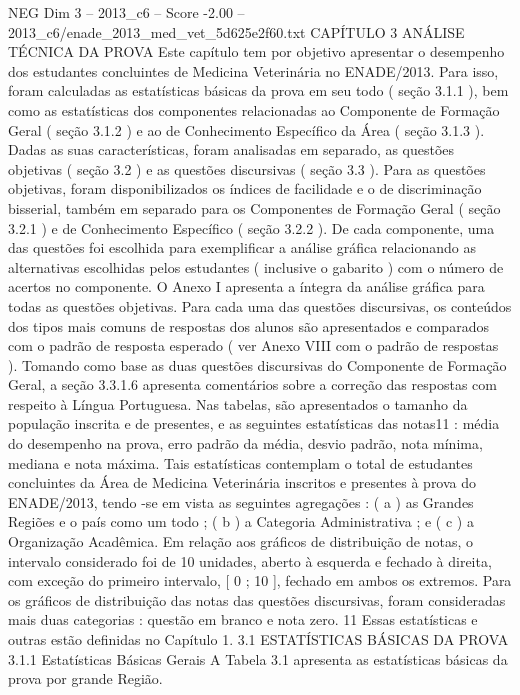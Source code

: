 \begin{textsample}{NEG Dim 3 – 2013\_c6 – Score -2.00 – 2013\_c6/enade\_2013\_med\_vet\_5d625e2f60.txt}  \label{ex:f3_neg_055}
CAPÍTULO 3 ANÁLISE TÉCNICA DA PROVA Este capítulo tem por objetivo apresentar o desempenho dos estudantes concluintes de Medicina Veterinária no ENADE/2013.
Para isso, foram calculadas as estatísticas básicas da prova em seu todo ( seção 3.1.1 ), bem como as estatísticas dos componentes relacionadas ao Componente de Formação Geral ( seção 3.1.2 ) e ao de Conhecimento Específico da Área ( seção 3.1.3 ).
Dadas as suas características, foram analisadas em separado, as questões objetivas ( seção 3.2 ) e as questões discursivas ( seção 3.3 ).
Para as questões objetivas, foram disponibilizados os índices de facilidade e o de discriminação bisserial, também em separado para os Componentes de Formação Geral ( seção 3.2.1 ) e de Conhecimento Específico ( seção 3.2.2 ).
De cada componente, uma das questões foi escolhida para exemplificar a análise gráfica relacionando as alternativas escolhidas pelos estudantes ( inclusive o gabarito ) com o número de acertos no componente.
O Anexo I apresenta a íntegra da análise gráfica para todas as questões objetivas.
Para cada uma das questões discursivas, os conteúdos dos tipos mais comuns de respostas dos alunos são apresentados e comparados com o padrão de resposta esperado ( ver Anexo VIII com o padrão de respostas ).
Tomando como base as duas questões discursivas do Componente de Formação Geral, a seção 3.3.1.6 apresenta comentários sobre a correção das respostas com respeito à Língua Portuguesa.
Nas tabelas, são apresentados o tamanho da população inscrita e de presentes, e as seguintes estatísticas das notas11 : média do desempenho na prova, erro padrão da média, desvio padrão, nota mínima, mediana e nota máxima.
Tais estatísticas contemplam o total de estudantes concluintes da Área de Medicina Veterinária inscritos e presentes à prova do ENADE/2013, tendo -se em vista as seguintes agregações : ( a ) as Grandes Regiões e o país como um todo ; ( b ) a Categoria Administrativa ; e ( c ) a Organização Acadêmica.
Em relação aos gráficos de distribuição de notas, o intervalo considerado foi de 10 unidades, aberto à esquerda e fechado à direita, com exceção do primeiro intervalo, [ 0 ; 10 ], fechado em ambos os extremos.
Para os gráficos de distribuição das notas das questões discursivas, foram consideradas mais duas categorias : questão em branco e nota zero. 11 Essas estatísticas e outras estão definidas no Capítulo 1. 3.1 ESTATÍSTICAS BÁSICAS DA PROVA 3.1.1 Estatísticas Básicas Gerais A Tabela 3.1 apresenta as estatísticas básicas da prova por grande Região.

\end{textsample}
